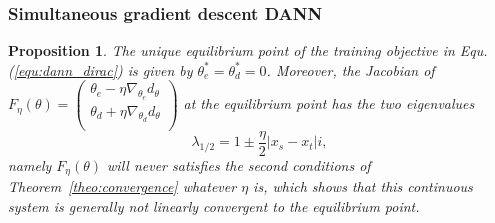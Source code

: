 \documentclass{article} \usepackage{iclr2023_conference,times}
\newtheorem{prop}{Proposition}
\newcommand{\myref}[1]{Equ. (\ref{#1})}
\begin{document}
\subsubsection{Simultaneous gradient descent DANN}

\begin{prop}
The unique equilibrium point of the training objective in \myref{equ:dann_dirac} is given by $\theta^*_e=\theta^*_d=0$. Moreover, the Jacobian of $F_\eta(\theta)=\left(         \begin{array}{c} 
    \theta_e-\eta\nabla_{\theta_e}d_{\theta} \\ 
    \theta_d+\eta\nabla_{\theta_d}d_{\theta}\\ 
  \end{array}\right)$ at the equilibrium point has the two eigenvalues
  \begin{equation}
      \lambda_{1/2}=1\pm \frac{\eta}{2}|x_s-x_t|i,
  \end{equation}
  namely $F_\eta(\theta)$ will never satisfies the second conditions of Theorem~\ref{theo:convergence} whatever $\eta$ is, which shows that this continuous system is generally not linearly convergent to the equilibrium point.
\label{prop:simdann}
\end{prop}
\end{document}
